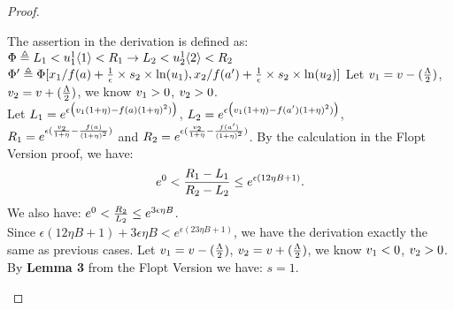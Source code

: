 \documentclass[a4paper,11pt]{article}
\begin{document}
\begin{proof}
\begin{itemize}
{
}
%
The assertion in the derivation is defined as:
\\
$\Phi \triangleq L_1 < 
u^1_1\langle 1 \rangle < R_1 \rightarrow 
		L_2 < u^1_2\langle 2 \rangle < R_2$
\\
$\Phi' \triangleq 
\Phi[x_1/f(a) + \frac{1}{\epsilon} \times s_2 \times \ln (u_1), x_2/f(a') + \frac{1}{\epsilon} \times s_2 \times \ln (u_2)] $
%
%
%
	Let $v_1 = v - (\frac{\Lambda}{2})$,
		$v_2 = v + (\frac{\Lambda}{2})$, 
		we know $v_1 > 0$, $v_2 > 0$.
\\
Let $L_1 = e^{\epsilon 
				\big( v_1(1 + \eta) - f(a) (1 + \eta)^2) \big)}$,
$L_2 = e^{\epsilon 
				\big( v_1(1 + \eta) - f(a') (1 + \eta)^2) \big)}$, 
$R_1 = e^{\epsilon 
		(\frac{v_2}{1 + \eta} - \frac{f(a)}{(1 + \eta)^2})}$
and $R_2 = e^{\epsilon 
		(\frac{v_2}{1 + \eta} - \frac{f(a')}{(1 + \eta)^2})}$.
By the calculation in the Flopt Version proof, we have:
\[
	e^0 < \frac{R_1 - L_1}{R_2 - L_2}
	\leq e^{\epsilon(12 \eta B + 1)}.
\]
%
	We also have:
	$e^0 < \frac{R_2}{L_2} \leq e^{3 \epsilon \eta B}$.
	\\
Since $ \epsilon(12 \eta B + 1) + 3 \epsilon \eta B < e^{\epsilon(23 \eta B + 1)}$, we have the derivation exactly the same as previous cases.
%
	Let $v_1 = v - (\frac{\Lambda}{2})$,
	$v_2 = v  + (\frac{\Lambda}{2})$,
	we know $v_1 < 0$, $v_2 > 0$.
	By \textbf{Lemma 3} from the Flopt Version we have: $s = 1$.	%

\end{itemize}
\end{proof}
\end{document}
